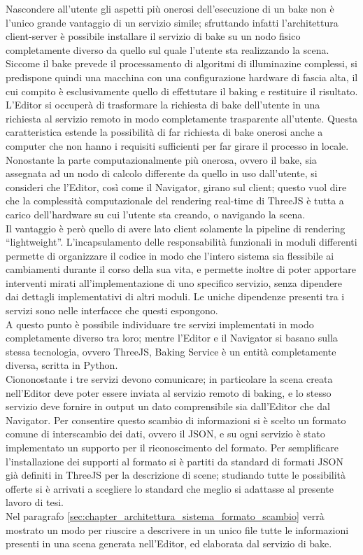 Nascondere all’utente gli aspetti più onerosi dell’esecuzione di un bake non è l’unico grande vantaggio di un servizio simile; sfruttando infatti l’architettura client-server è possibile installare il servizio di bake su un nodo fisico completamente diverso da quello sul quale l’utente sta realizzando la scena. 
Siccome il bake prevede il processamento di algoritmi di illuminazine complessi, si predispone quindi una macchina con una configurazione hardware di fascia alta, il cui compito è esclusivamente quello di effettutare il baking e restituire il risultato. L’Editor si occuperà di trasformare la richiesta di bake dell’utente in una richiesta al servizio remoto in modo completamente trasparente all’utente. 
Questa caratteristica estende la possibilità di far richiesta di bake onerosi anche a computer che non hanno i requisiti sufficienti per far girare il processo in locale. 
\\
Nonostante la parte computazionalmente più onerosa, ovvero il bake, sia assegnata ad un nodo di calcolo differente da quello in uso dall’utente, si consideri che l’Editor, così come il Navigator, girano sul client; questo vuol dire che la complessità computazionale del rendering real-time di ThreeJS è tutta a carico dell’hardware su cui l’utente sta creando, o navigando la scena. 
\\
Il vantaggio è però quello di avere lato client solamente la pipeline di rendering “lightweight”. L’incapsulamento delle responsabilità funzionali in moduli differenti permette di organizzare il codice in modo che l’intero sistema sia flessibile ai cambiamenti durante il corso della sua vita, e permette inoltre di poter apportare interventi mirati all’implementazione di uno specifico servizio, senza dipendere dai dettagli implementativi di altri moduli. Le uniche dipendenze presenti tra i servizi sono nelle interfacce che questi espongono.
\\  
A questo punto è possibile individuare tre servizi implementati in modo completamente diverso tra loro; mentre l’Editor e il Navigator si basano sulla stessa tecnologia, ovvero ThreeJS, Baking Service è un entità completamente diversa, scritta in Python. 
\\
Ciononostante i tre servizi devono comunicare; in particolare la scena creata nell’Editor deve poter essere inviata al servizio remoto di baking, e lo stesso servizio deve fornire in output un dato comprensibile sia dall’Editor che dal Navigator. Per consentire questo scambio di informazioni si è scelto un formato comune di interscambio dei dati, ovvero il JSON, e su ogni servizio è stato implementato un supporto per il riconoscimento del formato. Per semplificare l’installazione dei supporti al formato si è partiti da standard di formati JSON già definiti in ThreeJS per la descrizione di scene; studiando tutte le possibilità offerte si è arrivati a scegliere lo standard che meglio si adattasse al presente lavoro di tesi. 
\\
Nel paragrafo \ref{sec:chapter_architettura_sistema_formato_scambio} verrà mostrato un modo per riuscire a descrivere in un unico file tutte le informazioni presenti in una scena generata nell’Editor, ed elaborata dal servizio di bake.